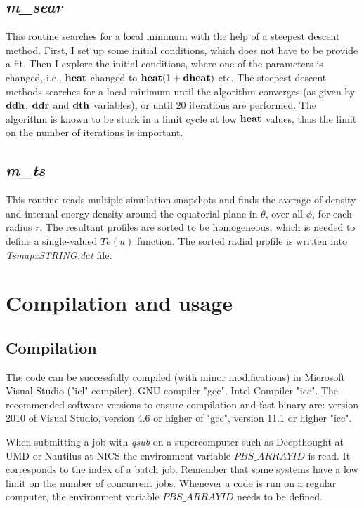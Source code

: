 \documentclass{emulateapj}
\begin{document}
\subsection{\textit{m\_sear}}
This routine searches for a local minimum with the help of a steepest descent method.
First, I set up some initial conditions, which does not have to be provide a fit.
Then I explore the initial conditions, where one of the parameters is changed, i.e., ${\bf heat}$ changed to ${\bf heat}(1+{\bf dheat})$
etc. The steepest descent methods searches for a local minimum until the algorithm converges (as given by
${\bf ddh}$, ${\bf ddr}$ and ${\bf dth}$ variables), or until $20$ iterations are performed.
The algorithm is known to be stuck in a limit cycle at low ${\bf heat}$ values, thus the limit on the number of
iterations is important.

\subsection{\textit{m\_ts}}
This routine reads multiple simulation snapshots and finds the average of density and internal energy density
around the equatorial plane in $\theta$, over all $\phi$, for each radius $r$.
The resultant profiles are sorted to be homogeneous, which is needed to define a single-valued $Te(u)$ function.
The sorted radial profile is written into \textit{TsmapxSTRING.dat} file.

\section{Compilation and usage}
\subsection{Compilation}
The code can be successfully compiled (with minor modifications) in Microsoft Visual Studio ("icl" compiler),
GNU compiler "gcc", Intel Compiler "icc". The recommended software versions to ensure compilation and
fast binary are: version 2010 of Visual Studio, version 4.6 or higher of "gcc", version 11.1 or higher "icc".

When submitting a job with \textit{qsub} on a supercomputer such as Deepthought at UMD or Nautilus at NICS
the environment variable $PBS\_ARRAYID$ is read. It corresponds to the index of a batch job.
Remember that some systems have a low limit on the number of concurrent jobs.
Whenever a code is run on a regular computer, the environment variable $PBS\_ARRAYID$ needs to be defined.
\end{document}
